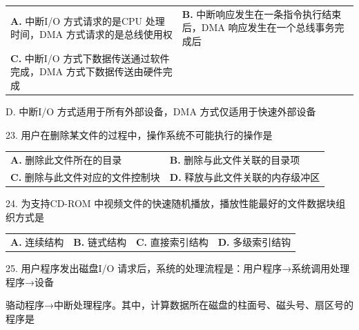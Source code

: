 \documentclass[UTF8,11pt]{ctexart}
\begin{document}
\begin{center}\begin{tabular}{>{\raggedright\arraybackslash}p{\dimexpr(\linewidth-4\tabcolsep)/2\relax}>{\raggedright\arraybackslash}p{\dimexpr(\linewidth-4\tabcolsep)/2\relax}}
\textbf{A.} 中断I/O 方式请求的是CPU 处理时间，DMA 方式请求的是总线使用权 & \textbf{B.} 中断响应发生在一条指令执行结束后，DMA 响应发生在一个总线事务完成后\\[.35em]
\textbf{C.} 中断I/O 方式下数据传送通过软件完成，DMA 方式下数据传送由硬件完成 & \\[.35em]\end{tabular}\end{center}

D. 中断I/O 方式适用于所有外部设备，DMA 方式仅适用于快速外部设备


23. 用户在删除某文件的过程中，操作系统不可能执行的操作是


\begin{center}\begin{tabular}{>{\raggedright\arraybackslash}p{\dimexpr(\linewidth-4\tabcolsep)/2\relax}>{\raggedright\arraybackslash}p{\dimexpr(\linewidth-4\tabcolsep)/2\relax}}
\textbf{A.} 删除此文件所在的目录 & \textbf{B.} 删除与此文件关联的目录项\\[.35em]
\textbf{C.} 删除与此文件对应的文件控制块 & \textbf{D.} 释放与此文件关联的内存级冲区\\[.35em]\end{tabular}\end{center}

24. 为支持CD-ROM 中视频文件的快速随机播放，播放性能最好的文件数据块组织方式是


\begin{center}\begin{tabular}{>{\raggedright\arraybackslash}p{\dimexpr(\linewidth-8\tabcolsep)/4\relax}>{\raggedright\arraybackslash}p{\dimexpr(\linewidth-8\tabcolsep)/4\relax}>{\raggedright\arraybackslash}p{\dimexpr(\linewidth-8\tabcolsep)/4\relax}>{\raggedright\arraybackslash}p{\dimexpr(\linewidth-8\tabcolsep)/4\relax}}
\textbf{A.} 连续结构 & \textbf{B.} 链式结构 & \textbf{C.} 直接索引结构 & \textbf{D.} 多级索引结钩\\[.35em]\end{tabular}\end{center}

25. 用户程序发出磁盘I/O 请求后，系统的处理流程是：用户程序→系统调用处理程序→设备


骆动程序→中断处理程序。其中，计算数据所在磁盘的柱面号、磁头号、扇区号的程序是
\end{document}
